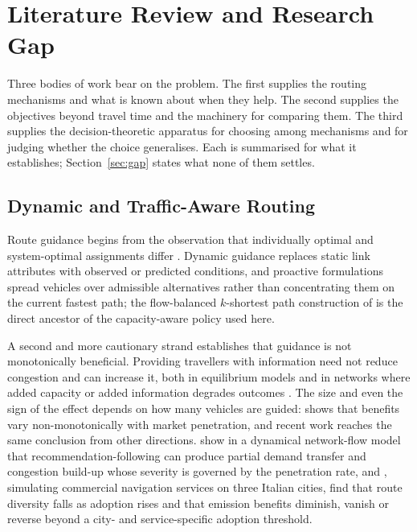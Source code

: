 
\section{Literature Review and Research Gap}
\label{sec:lit}

Three bodies of work bear on the problem. The first supplies the routing
mechanisms and what is known about when they help. The second supplies the
objectives beyond travel time and the machinery for comparing them. The third
supplies the decision-theoretic apparatus for choosing among mechanisms and for
judging whether the choice generalises. Each is summarised for what it
establishes; Section~\ref{sec:gap} states what none of them settles.

\subsection{Dynamic and Traffic-Aware Routing}
\label{sec:lit:routing}

Route guidance begins from the observation that individually optimal and
system-optimal assignments differ \citep{wardrop1952}. Dynamic guidance replaces
static link attributes with observed or predicted conditions, and proactive
formulations spread vehicles over admissible alternatives rather than
concentrating them on the current fastest path; the flow-balanced $k$-shortest
path construction of \citet{pan2013proactive} is the direct ancestor of the
capacity-aware policy used here.

A second and more cautionary strand establishes that guidance is not
monotonically beneficial. Providing travellers with information need not reduce
congestion and can increase it, both in equilibrium models
\citep{arnott1991information} and in networks where added capacity or added
information degrades outcomes \citep{acemoglu2018braess}. The size and even the
sign of the effect depends on how many vehicles are guided: \citet{yang1998penetration}
shows that benefits vary non-monotonically with market penetration, and recent
work reaches the same conclusion from other directions. \citet{toso2024detrimental}
show in a dynamical network-flow model that recommendation-following can produce
partial demand transfer and congestion build-up whose severity is governed by the
penetration rate, and \citet{cornacchia2026concentration}, simulating commercial
navigation services on three Italian cities, find that route diversity falls as
adoption rises and that emission benefits diminish, vanish or reverse beyond a
city- and service-specific adoption threshold.


